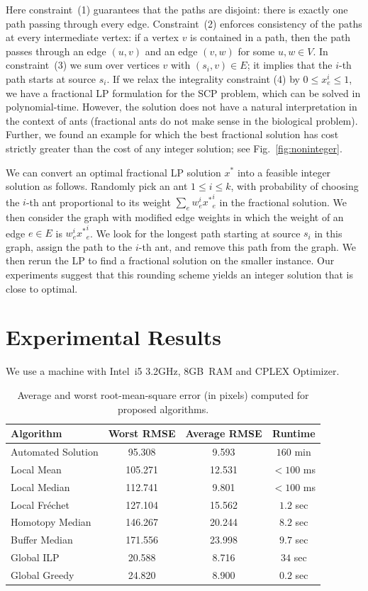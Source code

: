 \documentclass[runningheads]{llncs}
\newcommand{\Frechet}[0]{Fr\'{e}chet}
\newcommand{\SCoP}{\textsc{SCP}}
\begin{document}
Here constraint~(1) guarantees that the paths are
disjoint: there is exactly one path passing through every edge. Constraint~(2)
enforces consistency of the paths at
every intermediate vertex: if a vertex $v$ is contained in a path,
then the path passes through
an edge $(u,v)$ and an edge $(v,w)$ for some $u,w \in V$. In constraint~(3)
we sum over vertices $v$ with $(s_i,v)\in E$; it
implies that the $i$-th path
starts at source $s_i$.
%
If we relax the integrality constraint (4) by $0 \le x_e^i \le 1$,
we have a fractional LP formulation for the \SCoP{}
problem, which can be solved in polynomial-time. However,
the solution does not have a natural interpretation in the context of
ants (fractional ants do not make sense in the biological problem).
Further, we found an example for which the best
fractional solution has cost strictly greater than the cost of any
integer solution; see Fig.~\ref{fig:noninteger}.


We can convert an optimal fractional LP solution $x^*$ into a feasible integer solution as follows. Randomly
pick an ant $1 \le i \le k$, with probability of choosing the $i$-th
ant proportional to its weight $\sum_e w_e^i {x^*}_e^i$ in the fractional
solution. We then consider the graph with modified edge weights in which
the weight of an edge $e\in E$ is $w_e^i {x^*}_e^i$. We look for the longest path starting at source $s_i$ in this graph, assign the path to the $i$-th ant,
and remove this path from the graph. We then rerun the LP to
find a fractional solution on the smaller instance. Our experiments suggest that
this rounding scheme yields an integer solution that is close to optimal.

\section{Experimental Results}
We use a machine with Intel~i5 3.2GHz, 8GB~RAM and CPLEX Optimizer.

\begin{table}[t]
\centering
\caption{Average and worst root-mean-square error (in pixels) computed
for proposed algorithms.}
\label{tab:table2}
\medskip

\begin{tabular}{|l|c|c|c|}
\hline
Algorithm & Worst RMSE & Average RMSE & Runtime \\
\hline
Automated Solution      & 95.308    & 9.593 & $160$ min\\
Local Mean              & 105.271   & 12.531 & $<100$ ms \\
Local Median            & 112.741   & 9.801 & $<100$ ms \\
Local \Frechet{}        & 127.104    & 15.562 & $1.2$ sec \\
Homotopy Median         & 146.267   & 20.244 & $8.2$ sec \\
Buffer Median           & 171.556   & 23.998 & $9.7$ sec \\
Global ILP              & 20.588    & 8.716 & $34$ sec \\
Global Greedy           & 24.820    & 8.900 & $0.2$ sec \\
\hline
\end{tabular}
\end{table}
\end{document}

